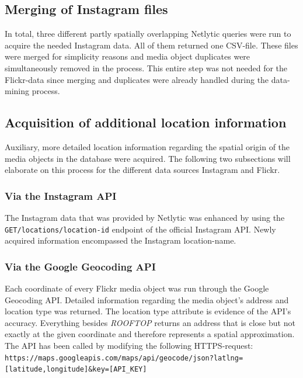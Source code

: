 \subsection{Merging of Instagram files} \label{netlytic_files_merge}
In total, three different partly spatially overlapping Netlytic queries were run to acquire the needed Instagram data. All of them returned one CSV-file. These files were merged for simplicity reasons and media object duplicates were simultaneously removed in the process. This entire step was not needed for the Flickr-data since merging and duplicates were already handled during the data-mining process.

\subsection{Acquisition of additional location information} \label{add_location_data}
Auxiliary, more detailed location information regarding the spatial origin of the media objects in the database were acquired. The following two subsections will elaborate on this process for the different data sources Instagram and Flickr.

\subsubsection*{Via the Instagram API} \label{geolocation_via_instagramapi}
The Instagram data that was provided by Netlytic was enhanced by using the \\ \texttt{GET/locations/location-id} endpoint of the official Instagram API. Newly acquired information encompassed the Instagram location-name.

\subsubsection*{Via the Google Geocoding API} \label{geocoding_api}
Each coordinate of every Flickr media object was run through the Google Geocoding API. Detailed information regarding the media object's address and location type was returned. The location type attribute is evidence of the API's accuracy. Everything besides \small{\textit{ROOFTOP}} returns an address that is close but not exactly at the given coordinate and therefore represents a spatial approximation. The API has been called by modifying the following HTTPS-request:\\
\texttt{\footnotesize{https://maps.googleapis.com/maps/api/geocode/json?latlng=[latitude,longitude]\&key=[API\_KEY]}}

